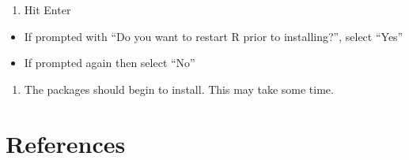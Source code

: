 \documentclass[
  letterpaper,
  DIV=11,
  numbers=noendperiod]{scrreprt}
\providecommand{\tightlist}{%
  \setlength{\itemsep}{0pt}\setlength{\parskip}{0pt}}\usepackage{longtable,booktabs,array}
\newlength{\cslhangindent}
\newlength{\cslentryspacingunit} %
\newenvironment{CSLReferences}[2] %
 {%
  \setlength{\parindent}{0pt}
  \ifodd #1
  \let\oldpar\par
  \def\par{\hangindent=\cslhangindent\oldpar}
  \fi
  \setlength{\parskip}{#2\cslentryspacingunit}
 }%
 {}
\begin{document}
\begin{enumerate}
\def\labelenumi{\arabic{enumi}.}
\setcounter{enumi}{3}
\tightlist
\item
  Hit Enter
\end{enumerate}

\begin{itemize}
\item
  If prompted with ``Do you want to restart R prior to installing?'',
  select ``Yes''
\item
  If prompted again then select ``No''
\end{itemize}

\begin{enumerate}
\def\labelenumi{\arabic{enumi}.}
\setcounter{enumi}{4}
\tightlist
\item
  The packages should begin to install. This may take some time.
\end{enumerate}


\hypertarget{references}{%
\chapter*{References}\label{references}}


\hypertarget{refs}{}
\begin{CSLReferences}{0}{0}
\end{CSLReferences}
\end{document}
